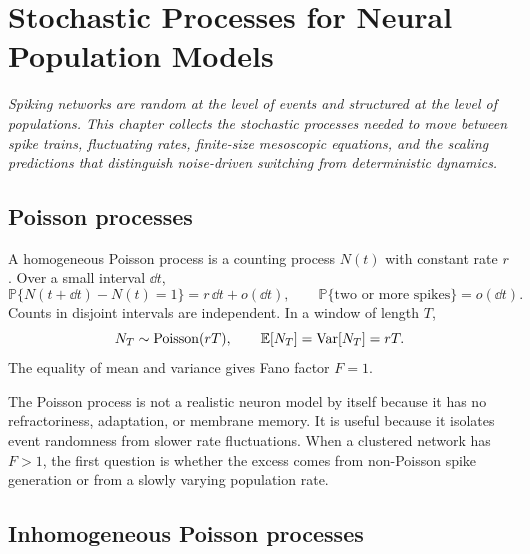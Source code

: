 \chapter{Stochastic Processes for Neural Population Models}
\label{ch:stochastic-processes}

\textit{Spiking networks are random at the level of events and structured at the level of populations. This chapter collects the stochastic processes needed to move between spike trains, fluctuating rates, finite-size mesoscopic equations, and the scaling predictions that distinguish noise-driven switching from deterministic dynamics.}

\section{Poisson processes}
\label{sec:poisson-processes}

A homogeneous Poisson process is a counting process $N(t)$ with constant rate $r$. Over a small interval $\dd t$,
%
\begin{equation}
  \mathbb{P}\{N(t+\dd t)-N(t)=1\}=r\,\dd t+o(\dd t),
  \qquad
  \mathbb{P}\{\text{two or more spikes}\}=o(\dd t).
  \label{eq:poisson-small-interval}
\end{equation}
%
Counts in disjoint intervals are independent. In a window of length $T$,
%
\begin{equation}
  N_T \sim \mathrm{Poisson}(rT),
  \qquad
  \mathbb{E}[N_T]=\operatorname{Var}[N_T]=rT.
  \label{eq:poisson-count-moments}
\end{equation}
%
The equality of mean and variance gives Fano factor $F=1$.

The Poisson process is not a realistic neuron model by itself because it has no refractoriness, adaptation, or membrane memory. It is useful because it isolates event randomness from slower rate fluctuations. When a clustered network has $F>1$, the first question is whether the excess comes from non-Poisson spike generation or from a slowly varying population rate.

\section{Inhomogeneous Poisson processes}
\label{sec:inhomogeneous-poisson}

